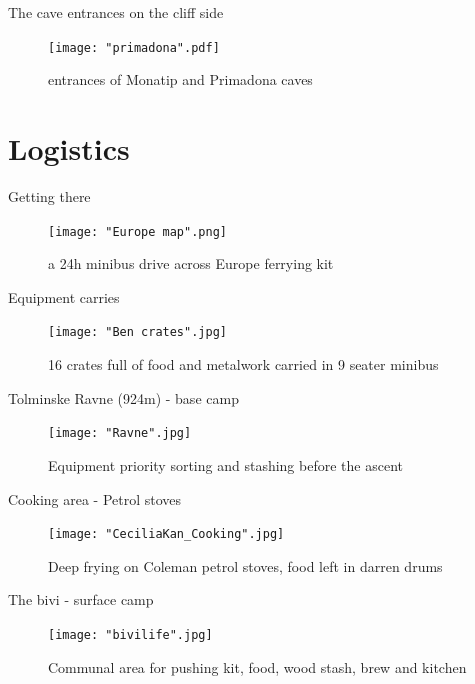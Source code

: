 \documentclass[10pt]{beamer}
\begin{document}
\begin{frame}{The cave entrances on the cliff side}
    \begin{figure}[!ht]
    \centering
    \texttt{[image: "primadona".pdf]}
    \caption{entrances of Monatip and Primadona caves}
    \end{figure}
\end{frame}


\section{Logistics} 
\begin{frame}{Getting there}
    \begin{figure}[!ht]
    \centering
    \texttt{[image: "Europe map".png]}
    \caption{a 24h minibus drive across Europe ferrying kit}
    \end{figure}
\end{frame}
\begin{frame}{Equipment carries}
    \begin{figure}[!ht]
    \centering
    \texttt{[image: "Ben crates".jpg]}
    \caption{16 crates full of food and metalwork carried in 9 seater minibus}
    \end{figure}
\end{frame}
\begin{frame}{Tolminske Ravne (924m) - base camp}
    \begin{figure}[!ht]
    \centering
    \texttt{[image: "Ravne".jpg]}
    \caption{Equipment priority sorting and stashing before the ascent}
    \end{figure}
\end{frame}

\begin{frame}{Cooking area - Petrol stoves}
    \begin{figure}[!ht]
    \centering
    \texttt{[image: "CeciliaKan\_Cooking".jpg]}
    \caption{Deep frying on Coleman petrol stoves, food left in darren drums}
    \end{figure}
\end{frame}

\begin{frame}{The bivi - surface camp}
    \begin{figure}[!ht]
    \centering
    \texttt{[image: "bivilife".jpg]}
    \caption{Communal area for pushing kit, food, wood stash, brew and kitchen}
    \end{figure}
\end{frame}
\end{document}
